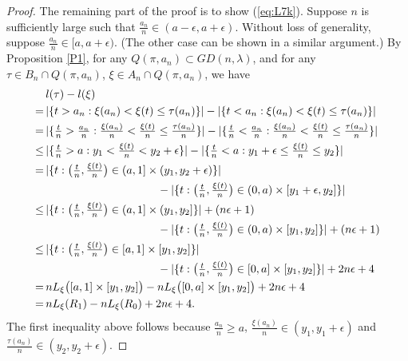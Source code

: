 \begin{proof}
The remaining part of the proof is to show (\ref{eq:L7k}). Suppose $n$ is sufficiently large such that $\frac{a_n}{n} \in (a - \epsilon, a + \epsilon)$. Without loss of generality, suppose
$\frac{a_n}{n} \in [a, a + \epsilon)$. (The other case can be shown in a similar argument.) By Proposition \ref{P1}, for any $Q(\pi, a_n) \subset GD(n, \lambda)$, and for any $\tau \in B_n \cap Q(\pi, a_n)$, $\xi \in A_n \cap Q(\pi, a_n)$, we have
\begin{align*}
  &l(\tau) - l(\xi)\\
 =\,&\textstyle|\{t > a_n : \xi(a_n) < \xi(t) \le \tau(a_n)\}| - |\{t < a_n : \xi(a_n) < \xi(t) \le \tau(a_n)\}|\\
 =\,&\textstyle|\{\frac{t}{n} > \frac{a_n}{n} : \frac{\xi(a_n)}{n} < \frac{\xi(t)}{n} \le \frac{\tau(a_n)}{n} \}|
    - |\{\frac{t}{n} < \frac{a_n}{n} : \frac{\xi(a_n)}{n} < \frac{\xi(t)}{n} \le \frac{\tau(a_n)}{n} \}|\\
 \le\,&\textstyle|\{\frac{t}{n} > a : y_1 < \frac{\xi(t)}{n} < y_2 + \epsilon \}|
    - |\{\frac{t}{n} < a : y_1 + \epsilon \le \frac{\xi(t)}{n} \le y_2 \}|\\
 =\, &\textstyle|\{t : \big(\frac{t}{n}, \frac{\xi(t)}{n}\big) \in (a, 1] \times (y_1, y_2 + \epsilon) \}|\\
      &\textstyle\qquad\qquad\qquad\qquad\qquad - |\{t : \big(\frac{t}{n}, \frac{\xi(t)}{n}\big) \in (0, a) \times [y_1 + \epsilon, y_2 ] \}|\\
 \le\,&\textstyle|\{t : \big(\frac{t}{n}, \frac{\xi(t)}{n}\big) \in (a, 1] \times (y_1, y_2] \}| + (n\epsilon+1)\\
     &\textstyle\qquad\qquad\qquad\qquad\qquad - |\{t : \big(\frac{t}{n}, \frac{\xi(t)}{n}\big) \in (0, a) \times [y_1 , y_2] \}| + (n\epsilon+1)\\
 \le\,&\textstyle|\{t : \big(\frac{t}{n}, \frac{\xi(t)}{n}\big) \in [a, 1] \times [y_1, y_2] \}|\\
     &\textstyle\qquad\qquad\qquad\qquad\qquad - |\{t : \big(\frac{t}{n}, \frac{\xi(t)}{n}\big) \in [0, a] \times [y_1 , y_2] \}| + 2n\epsilon +4\\
 =\, &\textstyle nL_{\xi}\big([a, 1] \times [y_1, y_2] \big) - nL_{\xi}\big([0, a] \times [y_1, y_2] \big) + 2n\epsilon +4\\
 =\, &\textstyle nL_{\xi}(R_1 ) - nL_{\xi}( R_0 ) + 2n\epsilon +4.
\end{align*}
The first inequality above follows because $\frac{a_n}{n} \ge a$, $\frac{\xi(a_n)}{n} \in (y_1, y_1 + \epsilon)$ and $\frac{\tau(a_n)}{n} \in (y_2, y_2 + \epsilon)$.

\end{proof}
